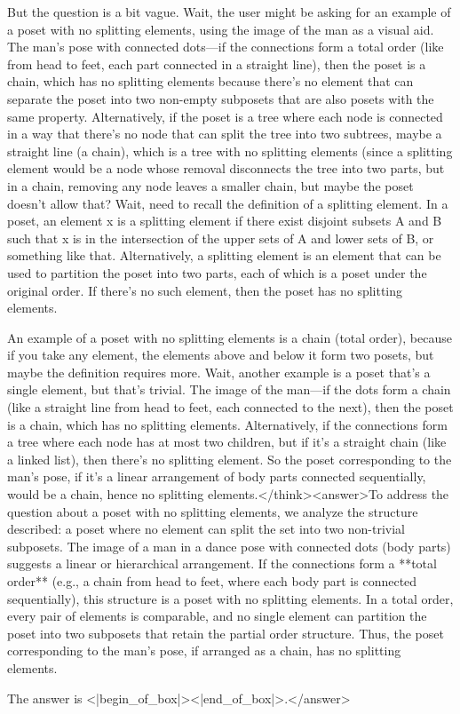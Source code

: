 But the question is a bit vague. Wait, the user might be asking for an example of a poset with no splitting elements, using the image of the man as a visual aid. The man's pose with connected dots—if the connections form a total order (like from head to feet, each part connected in a straight line), then the poset is a chain, which has no splitting elements because there's no element that can separate the poset into two non-empty subposets that are also posets with the same property. Alternatively, if the poset is a tree where each node is connected in a way that there's no node that can split the tree into two subtrees, maybe a straight line (a chain), which is a tree with no splitting elements (since a splitting element would be a node whose removal disconnects the tree into two parts, but in a chain, removing any node leaves a smaller chain, but maybe the poset doesn't allow that? Wait, need to recall the definition of a splitting element. In a poset, an element x is a splitting element if there exist disjoint subsets A and B such that x is in the intersection of the upper sets of A and lower sets of B, or something like that. Alternatively, a splitting element is an element that can be used to partition the poset into two parts, each of which is a poset under the original order. If there's no such element, then the poset has no splitting elements.

An example of a poset with no splitting elements is a chain (total order), because if you take any element, the elements above and below it form two posets, but maybe the definition requires more. Wait, another example is a poset that's a single element, but that's trivial. The image of the man—if the dots form a chain (like a straight line from head to feet, each connected to the next), then the poset is a chain, which has no splitting elements. Alternatively, if the connections form a tree where each node has at most two children, but if it's a straight chain (like a linked list), then there's no splitting element. So the poset corresponding to the man's pose, if it's a linear arrangement of body parts connected sequentially, would be a chain, hence no splitting elements.</think><answer>To address the question about a poset with no splitting elements, we analyze the structure described: a poset where no element can split the set into two non-trivial subposets. The image of a man in a dance pose with connected dots (body parts) suggests a linear or hierarchical arrangement. If the connections form a **total order** (e.g., a chain from head to feet, where each body part is connected sequentially), this structure is a poset with no splitting elements. In a total order, every pair of elements is comparable, and no single element can partition the poset into two subposets that retain the partial order structure. Thus, the poset corresponding to the man’s pose, if arranged as a chain, has no splitting elements.  

The answer is <|begin_of_box|><|end_of_box|>.</answer>